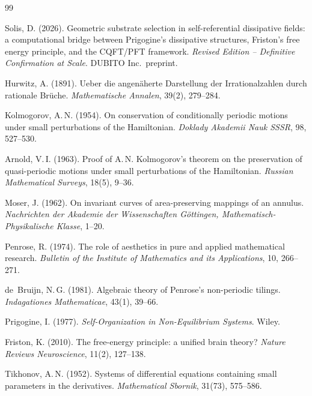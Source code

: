 \documentclass[11pt,a4paper]{article}
\theoremstyle{plain}
\theoremstyle{definition}
\begin{document}
\begin{thebibliography}{99}

Solis, D. (2026).
Geometric substrate selection in self-referential dissipative fields:
a computational bridge between Prigogine's dissipative structures,
Friston's free energy principle, and the CQFT/PFT framework.
\textit{Revised Edition -- Definitive Confirmation at Scale}.
DUBITO Inc.\ preprint.

Hurwitz, A. (1891).
Ueber die angen\"aherte Darstellung der Irrationalzahlen durch
rationale Br\"uche.
\textit{Mathematische Annalen}, 39(2), 279--284.

Kolmogorov, A.\,N. (1954).
On conservation of conditionally periodic motions under small
perturbations of the Hamiltonian.
\textit{Doklady Akademii Nauk SSSR}, 98, 527--530.

Arnold, V.\,I. (1963).
Proof of A.\,N. Kolmogorov's theorem on the preservation of
quasi-periodic motions under small perturbations of the Hamiltonian.
\textit{Russian Mathematical Surveys}, 18(5), 9--36.

Moser, J. (1962).
On invariant curves of area-preserving mappings of an annulus.
\textit{Nachrichten der Akademie der Wissenschaften G\"ottingen,
Mathematisch-Physikalische Klasse}, 1--20.

Penrose, R. (1974).
The role of aesthetics in pure and applied mathematical research.
\textit{Bulletin of the Institute of Mathematics and its Applications},
10, 266--271.

de~Bruijn, N.\,G. (1981).
Algebraic theory of Penrose's non-periodic tilings.
\textit{Indagationes Mathematicae}, 43(1), 39--66.

Prigogine, I. (1977).
\textit{Self-Organization in Non-Equilibrium Systems}.
Wiley.

Friston, K. (2010).
The free-energy principle: a unified brain theory?
\textit{Nature Reviews Neuroscience}, 11(2), 127--138.

Tikhonov, A.\,N. (1952).
Systems of differential equations containing small parameters in
the derivatives.
\textit{Mathematical Sbornik}, 31(73), 575--586.

\end{thebibliography}
\end{document}
